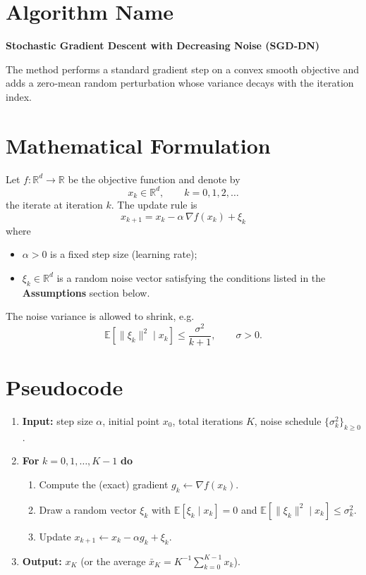 \documentclass{article}
\begin{document}
\section*{Algorithm Name}
\textbf{Stochastic Gradient Descent with Decreasing Noise (SGD‑DN)}  

The method performs a standard gradient step on a convex smooth objective and adds a zero‑mean random perturbation whose variance decays with the iteration index.

\section*{Mathematical Formulation}
Let $f:\mathbb{R}^{d}\rightarrow\mathbb{R}$ be the objective function and denote by 
\[
x_{k}\in\mathbb{R}^{d},\qquad k=0,1,2,\dots
\]
the iterate at iteration $k$.  The update rule is
\begin{equation}
\boxed{ \; x_{k+1}=x_{k}-\alpha\,\nabla f(x_{k})+\xi_{k}\; } \tag{1}
\end{equation}
where
\begin{itemize}
    \item $\alpha>0$ is a fixed step size (learning rate);
    \item $\xi_{k}\in\mathbb{R}^{d}$ is a random noise vector satisfying the conditions listed in the \textbf{Assumptions} section below.
\end{itemize}
The noise variance is allowed to shrink, e.g.
\begin{equation}
\mathbb{E}\!\left[\|\xi_{k}\|^{2}\mid x_{k}\right]\le \frac{\sigma^{2}}{k+1},\qquad \sigma>0. \tag{2}
\end{equation}

\section*{Pseudocode}
\begin{enumerate}[label=\textbf{Step \arabic*:},leftmargin=*]
\item \textbf{Input:} step size $\alpha$, initial point $x_{0}$, total iterations $K$, noise schedule $\{\sigma_{k}^{2}\}_{k\ge0}$.
\item \textbf{For} $k=0,1,\dots ,K-1$ \textbf{do}
    \begin{enumerate}[label=\arabic*.]
        \item Compute the (exact) gradient $g_{k}\gets\nabla f(x_{k})$.
        \item Draw a random vector $\xi_{k}$ with $\mathbb{E}[\xi_{k}\mid x_{k}]=0$ and 
        $\mathbb{E}[\|\xi_{k}\|^{2}\mid x_{k}]\le\sigma_{k}^{2}$.
        \item Update $x_{k+1}\gets x_{k}-\alpha g_{k}+\xi_{k}$.
    \end{enumerate}
\item \textbf{Output:} $x_{K}$ (or the average $\bar x_{K}=K^{-1}\sum_{k=0}^{K-1}x_{k}$).
\end{enumerate}
\end{document}
